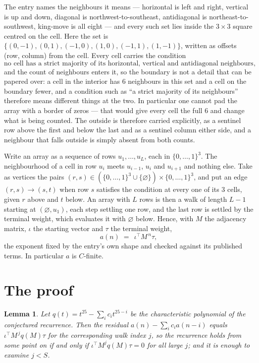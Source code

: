 \documentclass[11pt,a4paper]{article}
\theoremstyle{plain}
\newtheorem{lemma}[theorem]{Lemma}
\theoremstyle{definition}
\begin{document}
The entry names the neighbours it means --- horizontal is left and right, vertical is up and
down, diagonal is northwest-to-southeast, antidiagonal is northeast-to-southwest, king-move is
all eight --- and every such set lies inside the $3\times3$ square centred on the cell. Here
the set is $\{(0,-1), (0,1), (-1,0), (1,0), (-1,1), (1,-1)\}$, written as offsets (row, column) from the cell. Every cell carries
the condition
\[
\text{no cell has a strict majority of its horizontal, vertical and antidiagonal neighbours equal to 1},
\]
and the count of neighbours enters it, so the boundary is not a detail that can be papered
over: a cell in the interior has $6$ neighbours in this set and a cell on the boundary
fewer, and a condition such as ``a strict majority of its neighbours'' therefore means
different things at the two. In particular one cannot pad the array with a border of zeros ---
that would give every cell the full $6$ and change what is being counted. The outside is
therefore carried
explicitly, as a sentinel row above the first and below the last and as a sentinel column
either side, and a neighbour that falls outside is simply absent from both counts.

Write an array as a sequence of rows $u_1,\dots,u_L$, each in
$\{0,\dots,1\}^{3}$. The neighbourhood of a cell in row $u_i$ meets $u_{i-1}$,
$u_i$ and $u_{i+1}$ and nothing else. Take as vertices the pairs
$(r,s)\in(\{0,\dots,1\}^{3}\cup\{\varnothing\})\times\{0,\dots,1\}^{3}$,
and put an edge $(r,s)\to(s,t)$ when row $s$ satisfies the condition at every one of its
$3$ cells, given $r$ above and $t$ below. An array with $L$ rows is then a walk of length
$L-1$ starting at $(\varnothing,u_1)$, each step settling one row, and the last row is
settled by the terminal weight, which evaluates it with $\varnothing$ below. Hence,
with $M$ the adjacency matrix, $\iota$ the starting vector and $\tau$ the terminal weight,
\[
a(n)\;=\;\,\iota^{\!\top}M^{\,n}\tau ,
\]
the exponent fixed by the entry's own shape and checked against its published terms. In
particular $a$ is $C$-finite.

\section{The proof}

\begin{lemma}\label{lem:crit}
Let $q(t)=t^{25}-\sum_i c_it^{25-i}$ be the characteristic polynomial of the
conjectured recurrence. Then the residual $a(n)-\sum_ic_ia(n-i)$ equals
$\iota^{\!\top}M^{\,j}q(M)\tau$ for the corresponding walk index $j$, so the
recurrence holds from some point on if and only if $\iota^{\!\top}M^{j}q(M)\tau=0$ for all
large $j$; and it is enough to examine $j<S$.
\end{lemma}
\end{document}
